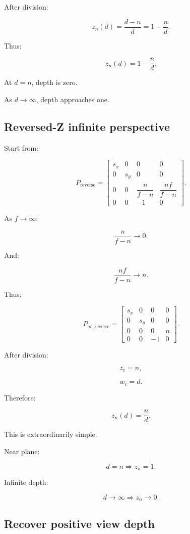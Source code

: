 After division:

\[
 z_n(d)= \frac{d-n}{d} = 1-\frac nd.
\]

Thus:

\[
 \boxed{ z_n(d)=1-\frac nd }.
\]

At \(d=n\), depth is zero.

As \(d\to\infty\), depth approaches one.

\subsection{Reversed-Z infinite perspective}\label{02-foundations-ii-ch033-reversed-z-infinite-perspective}

Start from:

\[
 P_{\mathrm{reverse}}= \begin{bmatrix} s_x&0&0&0\\ 0&s_y&0&0\\ 0&0&\dfrac n{f-n}&\dfrac{nf}{f-n}\\ 0&0&-1&0 \end{bmatrix}.
\]

As \(f\to\infty\):

\[
 \frac n{f-n}\to0.
\]

And:

\[
 \frac{nf}{f-n}\to n.
\]

Thus:

\[
 \boxed{ P_{\infty,\mathrm{reverse}}= \begin{bmatrix} s_x&0&0&0\\ 0&s_y&0&0\\ 0&0&0&n\\ 0&0&-1&0 \end{bmatrix} }.
\]

After division:

\[
 z_c=n,
\]

\[
 w_c=d.
\]

Therefore:

\[
 \boxed{ z_n(d)=\frac nd }.
\]

This is extraordinarily simple.

Near plane:

\[
 d=n\Rightarrow z_n=1.
\]

Infinite depth:

\[
 d\to\infty\Rightarrow z_n\to0.
\]

\subsection{Recover positive view depth}\label{02-foundations-ii-ch033-recover-positive-view-depth}

